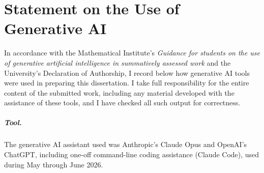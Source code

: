 %
%

\chapter*{Statement on the Use of Generative AI}

In accordance with the Mathematical Institute's \emph{Guidance for students on
the use of generative artificial intelligence in summatively assessed work} and
the University's Declaration of Authorship, I record below how generative AI
tools were used in preparing this dissertation. I take full responsibility for
the entire content of the submitted work, including any material developed with
the assistance of these tools, and I have checked all such output for
correctness.

\paragraph{Tool.}
The generative AI assistant used was Anthropic's Claude Opus and OpenAI's ChatGPT, 
including one-off command-line coding assistance (Claude Code), used during
May through June 2026.

